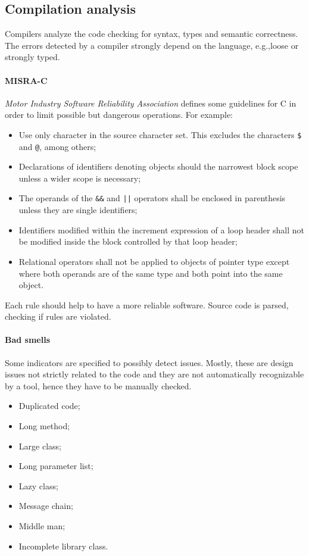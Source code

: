 \subsection{Compilation analysis}
Compilers analyze the code checking for syntax, types and semantic correctness. The errors detected by a compiler strongly depend on the language, e.g.,\@ loose or strongly typed.

\paragraph{MISRA-C}
\emph{Motor Industry Software Reliability Association} defines some guidelines for C in order to limit possible but dangerous operations. For example:
\begin{itemize}
\item Use only character in the source character set. This excludes the characters \texttt{\$} and \texttt{@}, among others;
\item Declarations of identifiers denoting objects should the narrowest block scope unless a wider scope is necessary;
\item The operands of the \texttt{\&\&} and \texttt{||} operators shall be enclosed in parenthesis unless they are single identifiers;
\item Identifiers modified within the increment expression of a loop header shall not be modified inside the block controlled by that loop header;
\item Relational operators shall not be applied to objects of pointer type except where both operands are of the same type and both point into the same object.
\end{itemize}
Each rule should help to have a more reliable software. Source code is parsed, checking if rules are violated.

\paragraph{Bad smells}
Some indicators are specified to possibly detect issues. Mostly, these are design issues not strictly related to the code and they are not automatically recognizable by a tool, hence they have to be manually checked.

\begin{multicols}{2}
\begin{itemize}
\item Duplicated code;
\item Long method;
\item Large class;
\item Long parameter list;
\item Lazy class;
\item Message chain;
\item Middle man;
\item Incomplete library class.
\end{itemize}
\end{multicols}

